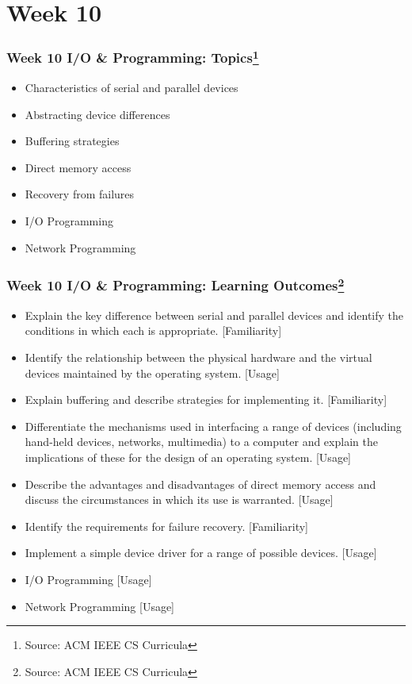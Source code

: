
\section{Week 10}
\begin{frame}[fragile]
\frametitle{Week 10 I/O \& Programming:
Topics\footnote{Source: ACM IEEE CS Curricula}}

\begin{itemize}
\item 
Characteristics of serial and parallel devices
\item 
Abstracting device differences
\item 
Buffering strategies
\item 
Direct memory access
\item 
Recovery from failures
\item
I/O Programming
\item
Network Programming
\end{itemize}
\end{frame}

\begin{frame}[fragile]
\frametitle{Week 10 I/O \& Programming:
Learning Outcomes\footnote{Source: ACM IEEE CS Curricula}}

\begin{itemize}
\item Explain the key difference between serial and parallel devices and identify the conditions in which each is appropriate. [Familiarity]
\item Identify the relationship between the physical hardware and the virtual devices maintained by the operating system. [Usage]
\item Explain buffering and describe strategies for implementing it. [Familiarity]
\item Differentiate the mechanisms used in interfacing a range of devices (including hand-held devices, networks, multimedia) to a computer and explain the implications of these for the design of an operating system. [Usage]
\item Describe the advantages and disadvantages of direct memory access and discuss the circumstances in
which its use is warranted. [Usage]
\item Identify the requirements for failure recovery. [Familiarity]
\item Implement a simple device driver for a range of possible devices. [Usage]

\item I/O Programming [Usage]
\item Network Programming [Usage]
\end{itemize}

\end{frame}



